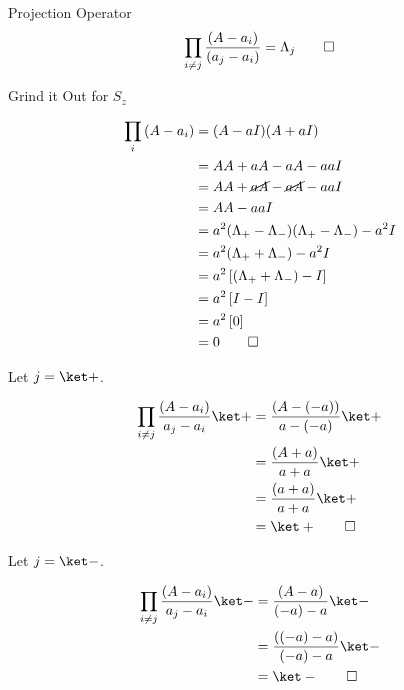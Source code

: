 \begin{answer}
\begin{answerpart}{Projection Operator}
  \begin{equation}
    \prod_{i \ne j}\frac{(A - a_i)}{(a_j - a_i)} = \Lambda_j \qed
  \end{equation}

\end{answerpart}



\begin{answerpart}{Grind it Out for \texorpdfstring{$S_z$}{Sz}}

  \begin{equation}
    \begin{split}
      \prod_i\left(A - a_i\right)
      &= (A - aI)(A + aI)\\
      &= AA + aA - aA - aaI\\
      &= AA + \cancel{aA} - \cancel{aA} - aaI\\
      &= AA  - aaI\\
      &= a^2(\Lambda_+ - \Lambda_-)(\Lambda_+ - \Lambda_-) - a^2I\\
      &= a^2(\Lambda_+ + \Lambda_-) - a^2I\\
      &= a^2\left[(\Lambda_+ + \Lambda_-) - I\right]\\
      &= a^2\left[I - I\right]\\
      &= a^2\left[0\right]\\
      &= 0 \qed
    \end{split}
  \end{equation}

  Let $j = \ket +$.

  \begin{equation}
    \begin{split}
      \prod_{i \ne j}\frac{(A - a_i)}{a_j - a_i} \ket +
      &= \frac{(A - (-a))}{a - (-a)}\ket +\\
      &= \frac{(A + a)}{a + a}\ket +\\
      &= \frac{(a + a)}{a + a}\ket +\\
      &= \ket + \qed\\
    \end{split}
  \end{equation}

  Let $j = \ket -$.

  \begin{equation}
    \begin{split}
      \prod_{i \ne j}\frac{(A - a_i)}{a_j - a_i} \ket -
      &= \frac{(A - a)}{(-a) - a}\ket -\\
      &= \frac{((-a) - a)}{(-a) -a}\ket -\\
      &= \ket - \qed\\
    \end{split}
  \end{equation}

\end{answerpart}

\end{answer}
